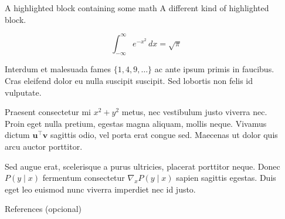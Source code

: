 \documentclass[final]{beamer}
\newlength{\sepwidth}
\newlength{\colwidth}
\newcommand{\separatorcolumn}{\begin{column}{\sepwidth}\end{column}}
\begin{document}
\begin{frame}[t]
\begin{columns}[t]
\begin{column}{\colwidth}
\begin{exampleblock}{A highlighted block containing some math}
    A different kind of highlighted block.

    $$
    \int_{-\infty}^{\infty} e^{-x^2}\,dx = \sqrt{\pi}
    $$

    Interdum et malesuada fames $\{1, 4, 9, \ldots\}$ ac ante ipsum primis in
    faucibus. Cras eleifend dolor eu nulla suscipit suscipit. Sed lobortis non
    felis id vulputate.


    Praesent consectetur mi $x^2 + y^2$ metus, nec vestibulum justo viverra
    nec. Proin eget nulla pretium, egestas magna aliquam, mollis neque. Vivamus
    dictum $\mathbf{u}^\intercal\mathbf{v}$ sagittis odio, vel porta erat
    congue sed. Maecenas ut dolor quis arcu auctor porttitor.


    Sed augue erat, scelerisque a purus ultricies, placerat porttitor neque.
    Donec $P(y \mid x)$ fermentum consectetur $\nabla_x P(y \mid x)$ sapien
    sagittis egestas. Duis eget leo euismod nunc viverra imperdiet nec id
    justo.

  \end{exampleblock}

 

  \begin{block}{References (opcional)}

    \nocite{*}
    \footnotesize{}

  \end{block}

\end{column}
\separatorcolumn



\end{columns}
\end{frame}
\end{document}
